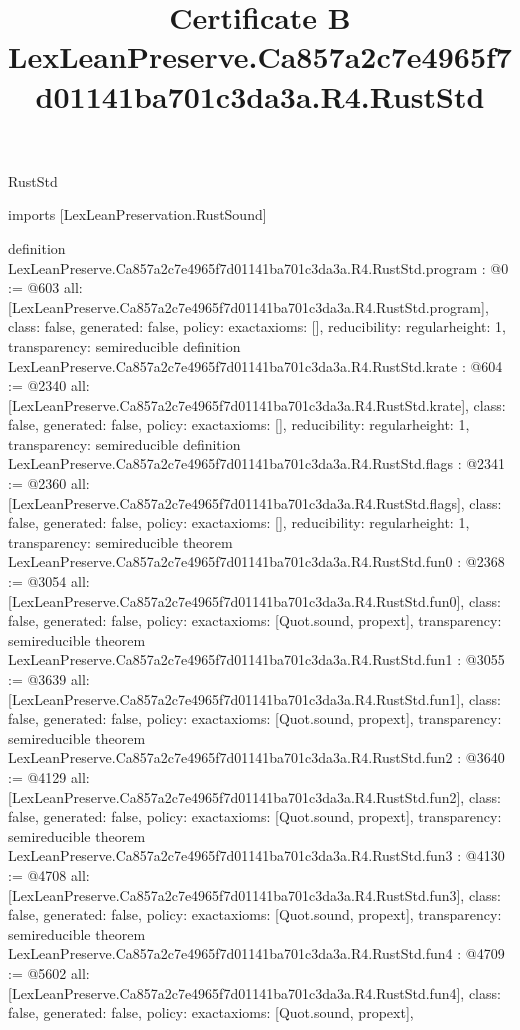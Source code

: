 \begin{lexlean}{RustStd}
\title{Certificate B LexLeanPreserve.Ca857a2c7e4965f7d01141ba701c3da3a.R4.RustStd}
\begin{coremodule}
imports [LexLeanPreservation.RustSound]

definition LexLeanPreserve.Ca857a2c7e4965f7d01141ba701c3da3a.R4.RustStd.program : @0 := @603 {
  all: [LexLeanPreserve.Ca857a2c7e4965f7d01141ba701c3da3a.R4.RustStd.program],
  class: false,
  generated: false,
  policy: exact{axioms: []},
  reducibility: regular{height: 1},
  transparency: semireducible
}
definition LexLeanPreserve.Ca857a2c7e4965f7d01141ba701c3da3a.R4.RustStd.krate : @604 := @2340 {
  all: [LexLeanPreserve.Ca857a2c7e4965f7d01141ba701c3da3a.R4.RustStd.krate],
  class: false,
  generated: false,
  policy: exact{axioms: []},
  reducibility: regular{height: 1},
  transparency: semireducible
}
definition LexLeanPreserve.Ca857a2c7e4965f7d01141ba701c3da3a.R4.RustStd.flags : @2341 := @2360 {
  all: [LexLeanPreserve.Ca857a2c7e4965f7d01141ba701c3da3a.R4.RustStd.flags],
  class: false,
  generated: false,
  policy: exact{axioms: []},
  reducibility: regular{height: 1},
  transparency: semireducible
}
theorem LexLeanPreserve.Ca857a2c7e4965f7d01141ba701c3da3a.R4.RustStd.fun0 : @2368 := @3054 {
  all: [LexLeanPreserve.Ca857a2c7e4965f7d01141ba701c3da3a.R4.RustStd.fun0],
  class: false,
  generated: false,
  policy: exact{axioms: [Quot.sound, propext]},
  transparency: semireducible
}
theorem LexLeanPreserve.Ca857a2c7e4965f7d01141ba701c3da3a.R4.RustStd.fun1 : @3055 := @3639 {
  all: [LexLeanPreserve.Ca857a2c7e4965f7d01141ba701c3da3a.R4.RustStd.fun1],
  class: false,
  generated: false,
  policy: exact{axioms: [Quot.sound, propext]},
  transparency: semireducible
}
theorem LexLeanPreserve.Ca857a2c7e4965f7d01141ba701c3da3a.R4.RustStd.fun2 : @3640 := @4129 {
  all: [LexLeanPreserve.Ca857a2c7e4965f7d01141ba701c3da3a.R4.RustStd.fun2],
  class: false,
  generated: false,
  policy: exact{axioms: [Quot.sound, propext]},
  transparency: semireducible
}
theorem LexLeanPreserve.Ca857a2c7e4965f7d01141ba701c3da3a.R4.RustStd.fun3 : @4130 := @4708 {
  all: [LexLeanPreserve.Ca857a2c7e4965f7d01141ba701c3da3a.R4.RustStd.fun3],
  class: false,
  generated: false,
  policy: exact{axioms: [Quot.sound, propext]},
  transparency: semireducible
}
theorem LexLeanPreserve.Ca857a2c7e4965f7d01141ba701c3da3a.R4.RustStd.fun4 : @4709 := @5602 {
  all: [LexLeanPreserve.Ca857a2c7e4965f7d01141ba701c3da3a.R4.RustStd.fun4],
  class: false,
  generated: false,
  policy: exact{axioms: [Quot.sound, propext]},
}
\end{coremodule}
\end{lexlean}
